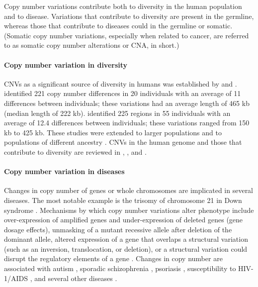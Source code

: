 Copy number variations contribute both to diversity in the human
population and to disease.
Variations that contribute to diversity are present in the germline,
whereas those that contribute to diseases could in the germline or
somatic. (Somatic copy number variations, especially when related to
cancer, are referred to as somatic copy number alterations or
CNA, in short.)

\paragraph{Copy number variation in diversity}
CNVs as a significant source of diversity in humans was established by
\cite{sebat2004large} and \cite{iafrate2004detection}.
%
\cite{sebat2004large} identified 221 copy number differences in 20
individuals with an average of 11 differences between individuals; these
variations had an average length of 465 kb (median length of 222 kb).
%
\cite{iafrate2004detection} identified 225 regions in 55 individuals
with an average of 12.4 differences between individuals; these
variations ranged from 150 kb to 425 kb.
%
These studies were extended to larger populations and to populations of
different ancestry \citep{redon2006global,li2009whole}.  CNVs in the
human genome and those that contribute to diversity are reviewed in
\cite{freeman2006copy}, \cite{feuk2006structural}, and
\cite{zarrei2015copy}.

\paragraph{Copy number variation in diseases}
Changes in copy number of genes or whole chromosomes are implicated in
several diseases. The most notable example is the trisomy of chromosome
21 in Down syndrome \citep{antonarakis2004chromosome}.
%
Mechanisms by which copy number variations alter phenotype include
over-expression of amplified genes and under-expression of deleted genes
(gene dosage effects), unmasking of a mutant recessive allele after
deletion of the dominant allele, altered expression of a gene that
overlaps a structural variation (such as an inversion, translocation, or
deletion), or a structural variation could disrupt the regulatory
elements of a gene \citep{feuk2006structural}.
%
Changes in copy number are associated with autism
\citep{sebat2007strong}, sporadic schizophrenia \citep{xu2008strong},
psoriasis \citep{hollox2008psoriasis}, susceptibility to HIV-1/AIDS
\citep{gonzalez2005influence}, and several other diseases
\citep{stankiewicz2010structural,fanciulli2010gene}.

